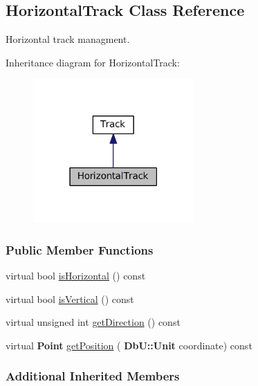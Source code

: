 \hypertarget{classKite_1_1HorizontalTrack}{}\subsection{Horizontal\+Track Class Reference}
\label{classKite_1_1HorizontalTrack}


Horizontal track managment.  




Inheritance diagram for Horizontal\+Track\+:\nopagebreak
\begin{figure}[H]
\begin{center}
\leavevmode
\includegraphics[width=174pt]{classKite_1_1HorizontalTrack__inherit__graph}
\end{center}
\end{figure}
\subsubsection*{Public Member Functions}
\begin{DoxyCompactItemize}
\item 
virtual bool \mbox{\hyperlink{classKite_1_1HorizontalTrack_a21b9cefd33ae22e4c2070ad441bdd30b}{is\+Horizontal}} () const
\item 
virtual bool \mbox{\hyperlink{classKite_1_1HorizontalTrack_abd54544ef1710ee4b67cfb021d73446c}{is\+Vertical}} () const
\item 
virtual unsigned int \mbox{\hyperlink{classKite_1_1HorizontalTrack_a0dd7cf705ace42c662c289955313b2e9}{get\+Direction}} () const
\item 
virtual \textbf{ Point} \mbox{\hyperlink{classKite_1_1HorizontalTrack_a6ab4f8026e4500918aa8721f1199f8b6}{get\+Position}} (\textbf{ Db\+U\+::\+Unit} coordinate) const
\end{DoxyCompactItemize}
\subsubsection*{Additional Inherited Members}


